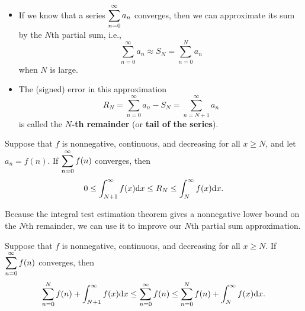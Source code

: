 \newpage

\begin{remark}\,
\begin{itemize}
\item If we know that a series $\displaystyle\sum_{n=0}^\infty a_n$ converges, 
then we can approximate its sum by the $N$th partial sum, i.e., 
\begin{equation*}
\sum_{n=0}^\infty a_n \approx S_N = \sum_{n=0}^N a_n
\end{equation*}
when $N$ is large.
\item The (signed) error in this approximation 
\begin{equation*}
R_N = \sum_{n=0}^\infty a_n - S_N = \sum_{n=N+1}^\infty a_n
\end{equation*}
is called the \textbf{$N$-th remainder} (or \textbf{tail of the series}).
\end{itemize}
\end{remark}

\begin{theorem}
Suppose that $f$ is nonnegative, continuous, and decreasing for all $x\ge N$, and let $a_n=f(n)$.
If $\displaystyle\sum_{n=0}^\infty f(n)$ converges, then 
\begin{equation*}
0\le  \int_{N+1}^\infty f(x)\mathrm{d} x\le R_N\le \int_{N}^\infty f(x)\mathrm{d} x.
\end{equation*}
\end{theorem}
\vfill

\begin{remark}
Because the integral test estimation theorem gives a nonnegative lower bound on the $N$th remainder, we can use it to improve our $N$th partial sum approximation.
\end{remark}

\begin{corollary}
Suppose that $f$ is nonnegative, continuous, and decreasing for all $x\ge N$.
If $\displaystyle\sum_{n=0}^\infty f(n)$ converges, then 
\begin{equation*}
\sum_{n=0}^Nf(n) +  \int_{N+1}^\infty f(x)\mathrm{d} x\le \sum_{n=0}^\infty f(n)\le \sum_{n=0}^Nf(n) +  \int_{N}^\infty f(x)\mathrm{d} x.
\end{equation*}
\end{corollary}
\vfill

